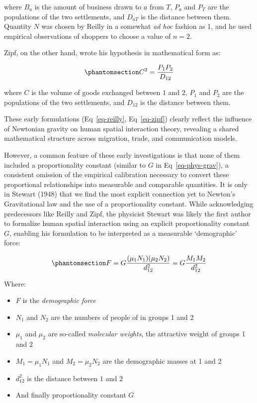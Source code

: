 \documentclass[
  10pt,
  letterpaper,
]{article}
\providecommand{\tightlist}{%
  \setlength{\itemsep}{0pt}\setlength{\parskip}{0pt}}
\begin{document}
\noindent where \(B_a\) is the amount of business drawn to \(a\) from
\(T\), \(P_a\) and \(P_T\) are the populations of the two settlements,
and \(D_{aT}\) is the distance between them. Quantity \(N\) was chosen
by Reilly in a somewhat \emph{ad hoc} fashion as 1, and he used
empirical observations of shoppers to choose a value of \(n = 2\).

Zipf, on the other hand, wrote his hypothesis in mathematical form as:

\begin{equation}\phantomsection\label{eq-zipf}{
C^2 = \frac{P_1 P_2}{D_{12}}
}\end{equation}

\noindent where \(C\) is the volume of goods exchanged between \(1\) and
\(2\), \(P_1\) and \(P_2\) are the populations of the two settlements,
and \(D_{12}\) is the distance between them.

These early formulations (Eq~\ref{eq-reilly}, Eq~\ref{eq-zipf}) clearly
reflect the influence of Newtonian gravity on human spatial interaction
theory, revealing a shared mathematical structure across migration,
trade, and communication models.

However, a common feature of these early investigations is that none of
them included a proportionality constant (similar to \(G\) in
Eq~\ref{eq-phys-grav}), a consistent omission of the empirical
calibration necessary to convert these proportional relationships into
measurable and comparable quantities. It is only in Stewart (1948)
\citep{stewartDemographicGravitationEvidence1948} that we find the most
explicit connection yet to Newton's Gravitational law and the use of a
proportionality constant. While acknowledging predecessors like Reilly
and Zipf, the physicist Stewart was likely the first author to formalize
human spatial interaction using an explicit proportionality constant
\(G\), enabling his formulation to be interpreted as a measurable
`demographic' force:

\begin{equation}\phantomsection\label{eq-stewart-force}{
F = G\frac{(\mu_1N_1)(\mu_2N_2)}{d_{12}^2} = G\frac{M_1 M_2}{d_{12}^2} 
}\end{equation}

\noindent Where:

\begin{itemize}
\tightlist
\item
  \(F\) is the \emph{demographic force}
\item
  \(N_1\) and \(N_2\) are the numbers of people of in groups 1 and 2
\item
  \(\mu_1\) and \(\mu_2\) are so-called \emph{molecular weights}, the
  attractive weight of groups 1 and 2
\item
  \(M_1 = \mu_1N_1\) and \(M_2 = \mu_2N_2\) are the demographic masses
  at 1 and 2
\item
  \(d_{12}^2\) is the distance between \(1\) and \(2\)
\item
  And finally proportionality constant \(G\)
\end{itemize}
\end{document}

